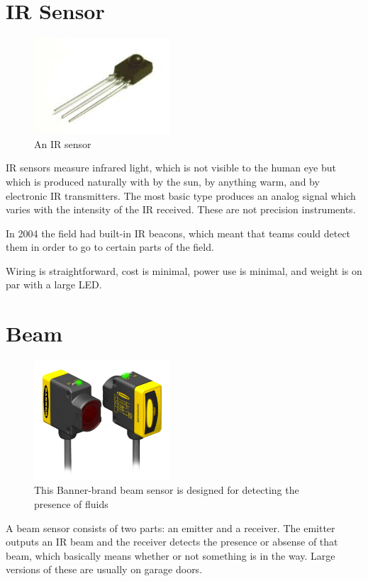 \documentclass{article}
\begin{document}
\section{IR Sensor}
\begin{figure}[ht]
\centering
\includegraphics[width=2in]{ir_sensor.jpeg}
\caption{An IR sensor}
\end{figure}
IR sensors measure infrared light, which is not visible to the human eye but which is produced naturally with by the sun, by anything warm, and by electronic IR transmitters.  The most basic type produces an analog signal which varies with the intensity of the IR received.  These are not precision instruments.  

In 2004 the field had built-in IR beacons, which meant that teams could detect them in order to go to certain parts of the field.  

Wiring is straightforward, cost is minimal, power use is minimal, and weight is on par with a large LED.  

\section{Beam}
\begin{figure}[ht]
\centering
\includegraphics[width=2in]{beam.jpeg}
\caption{This Banner-brand beam sensor is designed for detecting the presence of fluids}
\end{figure}

A beam sensor consists of two parts: an emitter and a receiver.  The emitter outputs an IR beam and the receiver detects the presence or absense of that beam, which basically means whether or not something is in the way.  Large versions of these are usually on garage doors.
\end{document}
